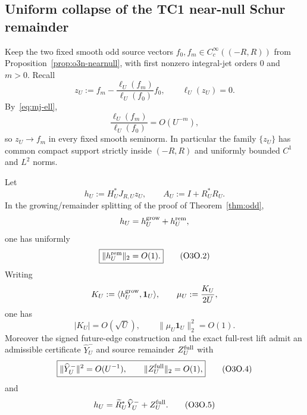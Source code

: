
\subsection{Uniform collapse of the TC1 near-null Schur remainder}
\label{subsec:o3o-nearnull-collapse}

Keep the two fixed smooth odd source vectors $f_0,f_m\in C_c^\infty((-R,R))$
from Proposition~\ref{prop:o3n-nearnull}, with first nonzero integral-jet orders
$0$ and $m>0$.  Recall
\[
 z_U:=f_m-\frac{\ell_U(f_m)}{\ell_U(f_0)}f_0,
 \qquad \ell_U(z_U)=0.
\]
By~\eqref{eq:mj-ell},
\[
 \frac{\ell_U(f_m)}{\ell_U(f_0)}=O(U^{-m}),
\tag{O3O.1}\label{eq:o3o-coeff}
\]
so $z_U\to f_m$ in every fixed smooth seminorm.  In particular the family
$\{z_U\}$ has common compact support strictly inside $(-R,R)$ and uniformly bounded
$C^1$ and $L^2$ norms.

\begin{lemma}
\label{lem:o3o-uniform-certificate}
Let
\[
 h_U:=H_U^*J_{R,U}z_U,
 \qquad
 A_U:=I+R_U^*R_U.
\]
In the growing/remainder splitting of the proof of Theorem~\ref{thm:odd},
\[
 h_U=h_U^{\rm grow}+h_U^{\rm rem},
\]
one has uniformly
\[
 \boxed{\|h_U^{\rm rem}\|_2=O(1).}
\tag{O3O.2}\label{eq:o3o-rem-bounded}
\]
Writing
\[
 K_U:=\langle h_U^{\rm grow},\mathbf1_U\rangle,
 \qquad
 \mu_U:=\frac{K_U}{2U},
\]
one has
\[
 \boxed{|K_U|=O(\sqrt U),
 \qquad
 \|\mu_U\mathbf1_U\|_2^2=O(1).}
\tag{O3O.3}\label{eq:o3o-Kmu}
\]
Moreover the signed future-edge construction and the exact full-rest lift admit an
admissible certificate $\widehat Y_U^-$ and source remainder $Z_U^{\rm full}$ with
\[
 \boxed{
 \|\widehat Y_U^-\|^2=O(U^{-1}),
 \qquad
 \|Z_U^{\rm full}\|_2=O(1),
 }
\tag{O3O.4}\label{eq:o3o-certificate-cost}
\]
and
\[
 h_U=\widetilde R_U^*\widehat Y_U^-+Z_U^{\rm full}.
\tag{O3O.5}\label{eq:o3o-certificate-decomp}
\]
\end{lemma}

